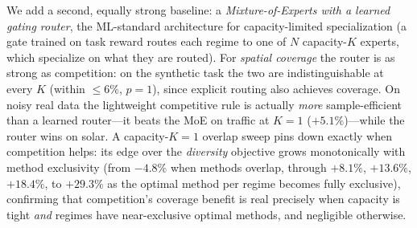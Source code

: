 \documentclass{article}
\begin{document}
We add a second, equally strong baseline: a \emph{Mixture-of-Experts with a learned
gating router}, the ML-standard architecture for capacity-limited specialization
(a gate trained on task reward routes each regime to one of $N$ capacity-$K$
experts, which specialize on what they are routed). For \emph{spatial coverage} the
router is as strong as competition: on the synthetic task the two are
indistinguishable at every $K$ (within $\leq6\%$, $p{=}1$), since explicit routing
also achieves coverage. On noisy real data the lightweight competitive rule is
actually \emph{more} sample-efficient than a learned router---it beats the MoE on
traffic at $K{=}1$ ($+5.1\%$)---while the router wins on solar. A capacity-$K{=}1$
overlap sweep pins down exactly when competition helps: its edge over the
\emph{diversity} objective grows monotonically with method exclusivity (from
$-4.8\%$ when methods overlap, through $+8.1\%$, $+13.6\%$, $+18.4\%$, to $+29.3\%$
as the optimal method per regime becomes fully exclusive), confirming that
competition's coverage benefit is real precisely when capacity is tight \emph{and}
regimes have near-exclusive optimal methods, and negligible otherwise.
\end{document}
